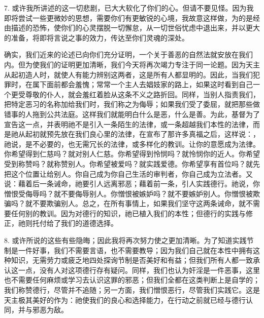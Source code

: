 7. 或许我所讲述的这一切悲剧，已大大软化了你们的心。但请不要见怪。因为我即将尝试一些更微妙的思想，需要你们有更敏锐的心境，我故意这样做，为的是经由描述的恐怖，使你们的心灵摆脱一切懈怠，从一切世俗忧虑中退出来，并以更大的准备，将即将言说之事的效力，传达至你们灵魂的深处。\par

确实，我们近来的论述已向你们充分证明，一个关于善恶的自然法就安放在我们内。但为使我们的证明更加清晰，我们今天将再次竭力专注于同一论题。因为天主从起初造人时，就使人有能力辨别这两者，这是所有人都显明的。因此，当我们犯罪时，在属下面前都会羞愧；常常一个主人去娼妓家的路上，如果这时看到自己一个更受尊敬的仆人，就会羞红着脸从这条不义之路折回。同样，当别人指责我们，把特定恶习的名称加给我们时，我们称之为侮辱；如果我们受了委屈，就把那些做错事的人拖到公共法庭。这样我们就能明白什么是恶，什么是善。为此，基督为了宣告这一点，并表明祂不是引入一条陌生的法律，或一条超越我们本性的法律，而是祂从起初就预先放在我们良心里的法律，在宣布了那许多真福之后，这样说：，祂说，是不必要的，也无需冗长的法律，或多样化的教训。让你的意愿成为法律。你希望得到仁慈吗？就对别人仁慈。你希望得到怜悯吗？就怜悯你的近人。你希望受到称赞吗？就称赞别人。你希望被爱吗？就实践爱德。你希望享有首位吗？就先把这个位置让给别人。你自己成为你自己生活的审判者，你自己成为立法者。又说：藉着后一条诫命，祂要引人远离邪恶；藉着前一条，引人实践德行。祂说，你憎恨受侮辱吗？就不要侮辱别人。你憎恨被嫉妒吗？就不要嫉妒别人。你憎恨被欺骗吗？就不要欺骗别人。总之，在所有事情上，如果我们坚守这两条诫命，就不需要任何别的教训。因为对德行的知识，祂已植入我们的本性；但德行的实践与修正，祂则托付给了我们的道德选择。\par

8. 或许所说的这些有些隐晦；因此我将再次努力使之更加清晰。为了知道实践节制是一件好事，我们不需要言语，也不需要教导；因为我们自己就在本性中拥有这种知识，无需劳力或疲乏地四处探询节制是否美好和有益；但我们所有人都一致承认这一点，没有人对这项德行存有疑问。同样，我们也认为奸淫是一件恶事，这里也不需要任何麻烦或学习去认识这罪的邪恶；但我们全都在这类判断上是自学的；我们称赞德行，尽管并不追随；另一方面，我们憎恨恶行，尽管我们实践它。这是天主极其美好的作为：祂使我们的良心和选择能力，在行动之前就已经与德行认同，并与邪恶为敌。\par

